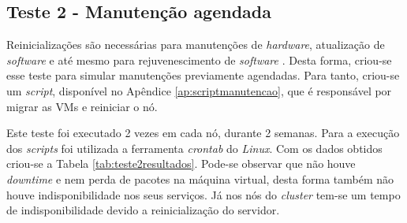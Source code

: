 \subsection{Teste 2 - Manutenção agendada}

Reinicializações são necessárias para manutenções de \textit{hardware}, atualização de \textit{software} e até mesmo para rejuvenescimento de
\textit{software} \cite{melo2014}. Desta forma, criou-se esse teste para simular manutenções previamente agendadas. Para tanto, criou-se 
um \textit{script}, disponível no Apêndice \ref{ap:scriptmanutencao}, que é responsável por migrar as \acp{VM} e reiniciar o nó.


Este teste foi executado 2 vezes em cada nó, durante 2 semanas. Para a execução dos \textit{scripts} foi utilizada a ferramenta 
\textit{crontab} do \textit{Linux}. Com os dados obtidos criou-se a Tabela \ref{tab:teste2resultados}.
Pode-se observar que não houve \textit{downtime} e nem perda de pacotes na máquina virtual, desta forma também não houve indisponibilidade nos 
seus serviços. Já nos nós do \textit{cluster} tem-se um tempo de indisponibilidade devido a reinicialização do servidor.


